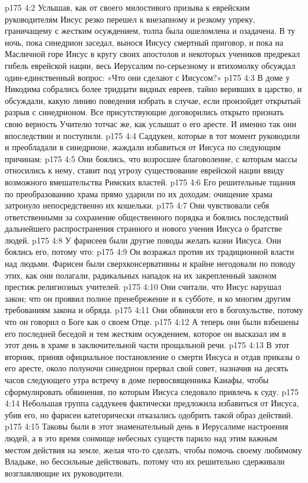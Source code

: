 \vs p175 4:2 \pc Услышав, как от своего милостивого призыва к еврейским руководителям Иисус резко перешел к внезапному и резкому упреку, граничащему с жестким осуждением, толпа была ошеломлена и озадачена. В ту ночь, пока синедрион заседал, вынося Иисусу смертный приговор, и пока на Масличной горе Иисус в кругу своих апостолов и некоторых учеников предрекал гибель еврейской нации, весь Иерусалим по\hyp{}серьезному и втихомолку обсуждал один\hyp{}единственный вопрос: «Что они сделают с Иисусом?»
\vs p175 4:3 \pc В доме у Никодима собрались более тридцати видных евреев, тайно веривших в царство, и обсуждали, какую линию поведения избрать в случае, если произойдет открытый разрыв с синедрионом. Все присутствующие договорились открыто признать свою верность Учителю тотчас же, как услышат о его аресте. И именно так они впоследствии и поступили.
\vs p175 4:4 Саддукеи, которые в тот момент руководили и преобладали в синедрионе, жаждали избавиться от Иисуса по следующим причинам:
\vs p175 4:5 \bibnobreakspace Они боялись, что возросшее благоволение, с которым массы относились к нему, ставит под угрозу существование еврейской нации ввиду возможного вмешательства Римских властей.
\vs p175 4:6 \pc {}\bibnobreakspace Его решительные тщания по преобразованию храма прямо ударили по их доходам; очищение храма затронуло непосредственно их кошельки.
\vs p175 4:7 \pc {}\bibnobreakspace Они чувствовали себя ответственными за сохранение общественного порядка и боялись последствий дальнейшего распространения странного и нового учения Иисуса о братстве людей.
\vs p175 4:8 \pc У фарисеев были другие поводы желать казни Иисуса. Они боялись его, потому что:
\vs p175 4:9 \bibnobreakspace Он возражал против их традиционной власти над людьми. Фарисеи были сверхконсервативны и крайне негодовали по поводу этих, как они полагали, радикальных нападок на их закрепленный законом престиж религиозных учителей.
\vs p175 4:10 \pc {}\bibnobreakspace Они считали, что Иисус нарушал закон; что он проявил полное пренебрежение и к субботе, и ко многим другим требованиям закона и обряда.
\vs p175 4:11 \pc {}\bibnobreakspace Они обвиняли его в богохульстве, потому что он говорил о Боге как о своем Отце.
\vs p175 4:12 \pc {}\bibnobreakspace А теперь они были взбешены его последней беседой и тем жестким осуждением, которое он высказал им в этот день в храме в заключительной части прощальной речи.
\vs p175 4:13 \pc В этот вторник, приняв официальное постановление о смерти Иисуса и отдав приказы о его аресте, около полуночи синедрион прервал свой совет, назначив на десять часов следующего утра встречу в доме первосвященника Каиафы, чтобы сформулировать обвинения, по которым Иисуса следовало привлечь к суду.
\vs p175 4:14 Небольшая группа саддукеев фактически предложила избавиться от Иисуса, убив его, но фарисеи категорически отказались одобрить такой образ действий.
\vs p175 4:15 \pc Таковы были в этот знаменательный день в Иерусалиме настроения людей, а в это время сонмище небесных существ парило над этим важным местом действия на земле, желая что\hyp{}то сделать, чтобы помочь своему любимому Владыке, но бессильные действовать, потому что их решительно сдерживали возглавляющие их руководители.
